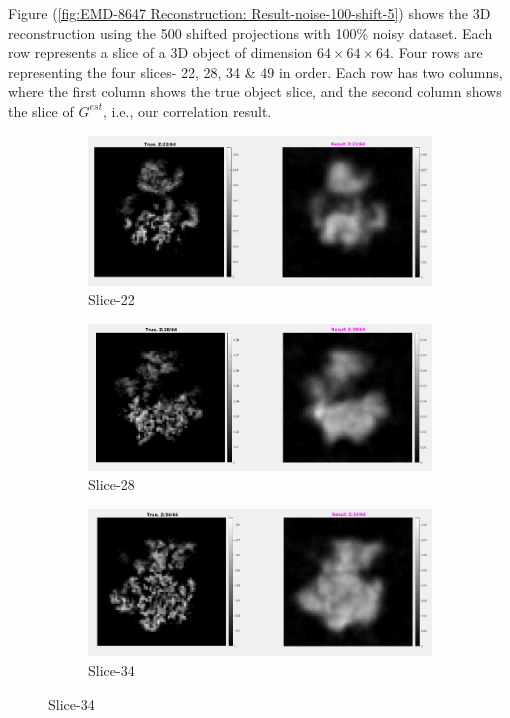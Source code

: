\documentclass[twoside]{iitbreport}
\begin{document}
Figure (\ref{fig:EMD-8647 Reconstruction: Result-noise-100-shift-5}) shows the 3D reconstruction using the 500 shifted projections with 100\% noisy dataset. Each row represents a slice of a 3D object of dimension $64\times64\times64$. Four rows are representing the four slices- 22, 28, 34 \& 49 in order. Each row has two columns, where the first column shows the true object slice, and the second column shows the slice of $G^{est}$, i.e., our correlation result. 

\begin{figure}[H]
\centering

\begin{subfigure}{1\textwidth}
\centering
\includegraphics[width=0.8\linewidth]{emd_8647_result_sharp_1.png}
\captionsetup{justification=centering}
\caption{ Slice-22 }
\end{subfigure} 

\begin{subfigure}{1\textwidth}
\centering
\includegraphics[width=0.8\linewidth]{emd_8647_result_sharp_2.png}
\captionsetup{justification=centering}
\caption{ Slice-28 }
\end{subfigure} 

\begin{subfigure}{1\textwidth}
\centering
\includegraphics[width=0.8\linewidth]{emd_8647_result_sharp_3.png}
\captionsetup{justification=centering}
\caption{ Slice-34 }
\end{subfigure} 


\end{figure}
\end{document}
